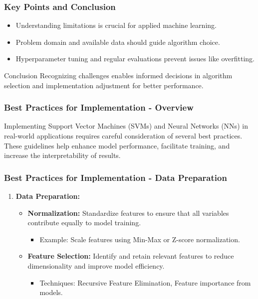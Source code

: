 \documentclass[aspectratio=169]{beamer}
\begin{document}
\begin{frame}[fragile]
    \frametitle{Key Points and Conclusion}
    \begin{itemize}
        \item Understanding limitations is crucial for applied machine learning.
        \item Problem domain and available data should guide algorithm choice.
        \item Hyperparameter tuning and regular evaluations prevent issues like overfitting.
    \end{itemize}
    \begin{block}{Conclusion}
        Recognizing challenges enables informed decisions in algorithm selection and implementation adjustment for better performance.
    \end{block}
\end{frame}

\begin{frame}[fragile]
    \frametitle{Best Practices for Implementation - Overview}
    Implementing Support Vector Machines (SVMs) and Neural Networks (NNs) in real-world applications requires careful consideration of several best practices. These guidelines help enhance model performance, facilitate training, and increase the interpretability of results.
\end{frame}

\begin{frame}[fragile]
    \frametitle{Best Practices for Implementation - Data Preparation}
    \begin{enumerate}
        \item \textbf{Data Preparation:}
        \begin{itemize}
            \item \textbf{Normalization:} 
            Standardize features to ensure that all variables contribute equally to model training.
            \begin{itemize}
                \item Example: Scale features using Min-Max or Z-score normalization.
            \end{itemize}
            \item \textbf{Feature Selection:}
            Identify and retain relevant features to reduce dimensionality and improve model efficiency.
            \begin{itemize}
                \item Techniques: Recursive Feature Elimination, Feature importance from models.
            \end{itemize}
        \end{itemize}
    \end{enumerate}
\end{frame}
\end{document}
